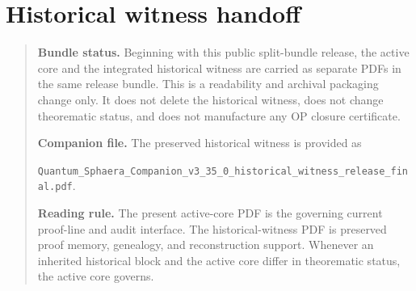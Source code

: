 \section*{Historical witness handoff}
\begin{quote}\small
\noindent\textbf{Bundle status.} Beginning with this public split-bundle release, the active core and the integrated historical witness are carried as separate PDFs in the same release bundle. This is a readability and archival packaging change only. It does not delete the historical witness, does not change theorematic status, and does not manufacture any OP closure certificate.

\medskip
\noindent\textbf{Companion file.} The preserved historical witness is provided as\par
\texttt{Quantum\_Sphaera\_Companion\_v3\_35\_0\_historical\_witness\_release\_final.pdf}.

\medskip
\noindent\textbf{Reading rule.} The present active-core PDF is the governing current proof-line and audit interface. The historical-witness PDF is preserved proof memory, genealogy, and reconstruction support. Whenever an inherited historical block and the active core differ in theorematic status, the active core governs.
\end{quote}

